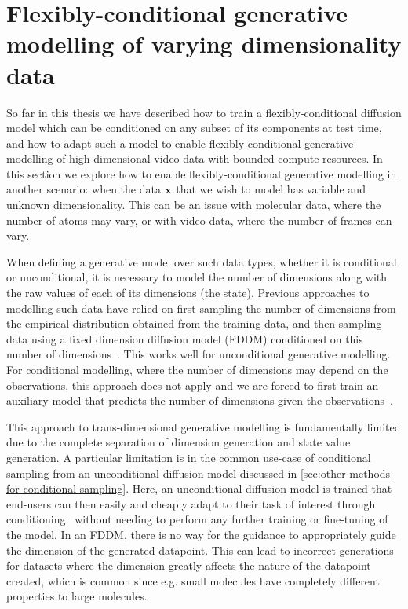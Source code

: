 \newtheorem{proposition}{Proposition}
\newtheorem{lemma}{Lemma}
\newtheorem{assumption}{Assumption}

\chapter{Flexibly-conditional generative modelling of varying dimensionality data}
\label{ch:tddm}

So far in this thesis we have described how to train a flexibly-conditional diffusion model which can be conditioned on any subset of its components at test time, and how to adapt such a model to enable flexibly-conditional generative modelling of high-dimensional video data with bounded compute resources. In this section we explore how to enable flexibly-conditional generative modelling in another scenario: when the data ${\mathbf{x}}$ that we wish to model has variable and unknown dimensionality. This can be an issue with molecular data, where the number of atoms may vary, or with video data, where the number of frames can vary. 

When defining a generative model over such data types, whether it is conditional or unconditional, it is necessary to model the number of dimensions along with the raw values of each of its dimensions (the state). Previous approaches to modelling such data have relied on first sampling the number of dimensions from the empirical distribution obtained from the training data, and then sampling data using a fixed dimension diffusion model (FDDM) conditioned on this number of dimensions~\citep{hoogeboom2022equivariant}. This works well for unconditional generative modelling. For conditional modelling, where the number of dimensions may depend on the observations, this approach does not apply and we are forced to first train an auxiliary model that predicts the number of dimensions given the observations~\citep{igashov2022equivariant}.

This approach to trans-dimensional generative modelling is fundamentally limited due to the complete separation of dimension generation and state value generation. A particular limitation is in the common use-case of conditional sampling from an unconditional diffusion model discussed in \cref{sec:other-methods-for-conditional-sampling}. Here, an unconditional diffusion model is trained that end-users can then easily and cheaply adapt to their task of interest through conditioning~\citep{song2020score, dhariwal2021diffusion, clip_guided_diffusion, zhang2023towards} without needing to perform any further training or fine-tuning of the model. In an FDDM, there is no way for the guidance to appropriately guide the dimension of the generated datapoint. This can lead to incorrect generations for datasets where the dimension greatly affects the nature of the datapoint created, which is common since e.g. small molecules have completely different properties to large molecules.

